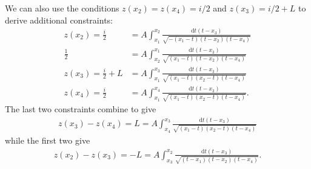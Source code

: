 \documentclass[10pt]{article}
\newcommand{\dif}{\mathrm{d}}
\theoremstyle{plain}
\theoremstyle{definition}
\theoremstyle{plain}
\begin{document}
We can also use the conditions $z(x_2) = z(x_4)=i/2$ and $z(x_3) = i/2 + L$ to derive additional constraints:
\begin{align}
	z(x_2) = \frac{i}{2} &= A\int_{x_1}^{x_2} \frac{\dif t (t-x_3)}{\sqrt{-(x_1-t)(t-x_2)(t-x_4)}}\nonumber \\
	 \frac{1}{2} &= A\int_{x_2}^{x_1} \frac{\dif t (t-x_3)}{\sqrt{(x_1-t)(t-x_2)(t-x_4)}} \label{c1} \\
	z(x_3) = \frac{i}{2}+L &= A\int_{x_1}^{x_3} \frac{\dif t (t-x_3)}{\sqrt{(x_1-t)(x_2-t)(t-x_4)}} \nonumber\\
	z(x_4) = \frac{i}{2} &= A\int_{x_1}^{x_4} \frac{\dif t (t-x_3)}{\sqrt{(x_1-t)(x_2-t)(t-x_4)}}. \nonumber
\end{align}
The last two constraints combine to give
\begin{align}
	z(x_3)-z(x_4) = L = A\int_{x_4}^{x_3} \frac{\dif t (t-x_3)}{\sqrt{(x_1-t)(x_2-t)(t-x_4)}} \label{c2}
\end{align}
while the first two give
\begin{align}
	z(x_2)-z(x_3)= -L  = A\int_{x_3}^{x_2} \frac{\dif t (t-x_3)}{\sqrt{(t-x_1)(t-x_2)(t-x_4)}}. \label{c3}
\end{align}
\end{document}
